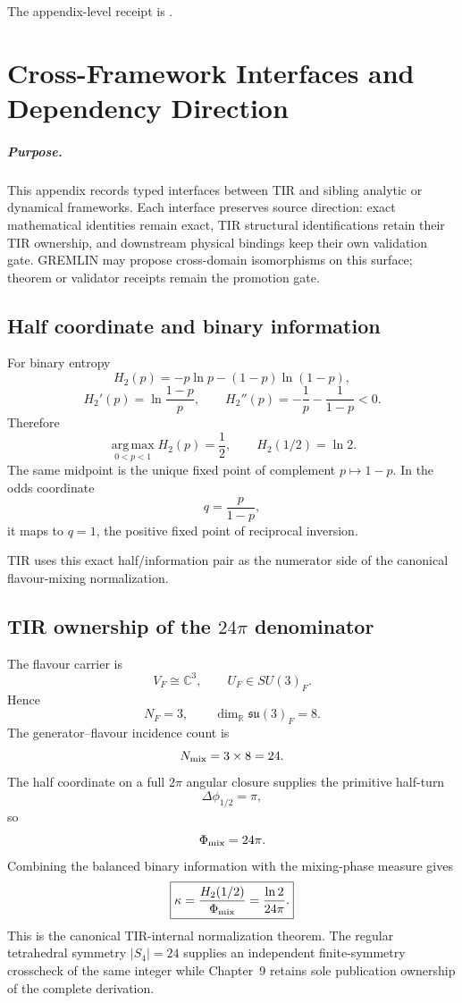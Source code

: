 The appendix-level receipt is
.

\clearpage

\chapter{Cross-Framework Interfaces and Dependency Direction}
\label{app:v12_cross_framework}

\paragraph{Purpose.}
This appendix records typed interfaces between TIR and sibling analytic or
dynamical frameworks.  Each interface preserves source direction: exact
mathematical identities remain exact, TIR structural identifications retain
their TIR ownership, and downstream physical bindings keep their own validation
gate.  GREMLIN may propose cross-domain isomorphisms on this surface; theorem or
validator receipts remain the promotion gate.

\section{Half coordinate and binary information}

For binary entropy
\[
H_2(p)=-p\ln p-(1-p)\ln(1-p),
\]
\[
H_2'(p)=\ln\frac{1-p}{p},
\qquad
H_2''(p)=-\frac1p-\frac1{1-p}<0.
\]
Therefore
\[
\boxed{
\operatorname*{arg\,max}_{0<p<1}H_2(p)=\frac12,
\qquad
H_2(1/2)=\ln2.
}
\]
The same midpoint is the unique fixed point of complement \(p\mapsto1-p\).
In the odds coordinate
\[
q=\frac{p}{1-p},
\]
it maps to \(q=1\), the positive fixed point of reciprocal inversion.

TIR uses this exact half/information pair as the numerator side of the canonical
flavour-mixing normalization.

\section{TIR ownership of the \(24\pi\) denominator}

The flavour carrier is
\[
V_F\cong\mathbb C^3,
\qquad
U_F\in SU(3)_F.
\]
Hence
\[
N_F=3,\qquad
\dim_{\mathbb R}\mathfrak{su}(3)_F=8.
\]
The generator--flavour incidence count is
\[
N_{\rm mix}=3\times8=24.
\]
The half coordinate on a full \(2\pi\) angular closure supplies the primitive
half-turn
\[
\Delta\phi_{1/2}=\pi,
\]
so
\[
\Phi_{\rm mix}=24\pi.
\]
Combining the balanced binary information with the mixing-phase measure gives
\[
\boxed{
\kappa
=\frac{H_2(1/2)}{\Phi_{\rm mix}}
=\frac{\ln2}{24\pi}.
}
\]
This is the canonical TIR-internal normalization theorem.  The regular
tetrahedral symmetry \(|S_4|=24\) supplies an independent finite-symmetry
crosscheck of the same integer while Chapter~9 retains sole publication
ownership of the complete derivation.

